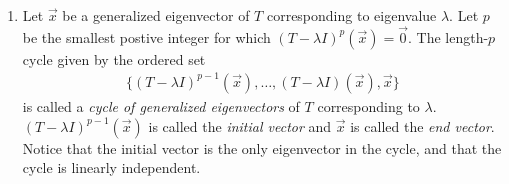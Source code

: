 \documentclass[10pt]{article}
\begin{document}
\begin{multicols*}{2}
\begin{enumerate}
\begin{enumerate}
         
        \item Let $\vec{x}$ be a generalized eigenvector of $T$ corresponding to eigenvalue $\lambda$. Let $p$ be the smallest postive integer for which $(T-\lambda I)^p(\vec{x}) = \vec{0}$. The length-$p$ cycle given by the ordered set
        \begin{align*}
            \{ (T-\lambda I)^{p-1}(\vec{x}), \hdots, (T-\lambda I)(\vec{x}), \vec{x} \}
        \end{align*}
        is called a \textit{cycle of generalized eigenvectors} of $T$ corresponding to $\lambda$. $(T-\lambda I)^{p-1}(\vec{x})$ is called the \textit{initial vector} and $\vec{x}$ is called the \textit{end vector}. Notice that the initial vector is the only eigenvector in the cycle, and that the cycle is linearly independent.
        

\end{enumerate}
\end{enumerate}
\end{multicols*}
\end{document}
